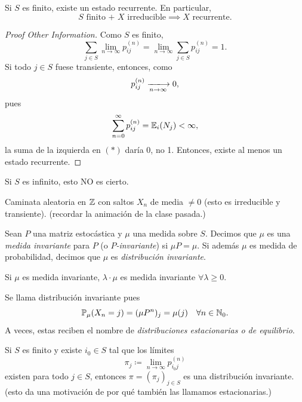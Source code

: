 \begin{corollary}
	Si $S$ es finito, existe un estado recurrente. En particular,
	\[ S \text{ finito + } X \text{ irreducible} \implies X \text{ recurrente}. \]
\end{corollary}
\begin{proof}[Proof Other Information]
	Como $S$ es finito,
	\[ \sum_{j \in S} \lim_{n \to \infty} p_{ij}^{(n)} = \lim_{n \to \infty} \sum_{j \in S} p_{ij}^{(n)} = 1. \tag{$*$} \]
	Si todo $j \in S$ fuese transiente, entonces, como
	\[ p_{ij}^{(n)} \xlongrightarrow[n \to \infty]{} 0, \]
	pues 
	\[ \sum_{n=0}^{\infty} p_{ij}^{(n)} = \mathbb{E}_{i}(N_{j}) < \infty, \]
	la suma de la izquierda en $(*)$ daría 0, no 1. Entonces, existe al menos un estado recurrente.
\end{proof}

\begin{comentarios}
	Si $S$ es infinito, esto NO es cierto.
\end{comentarios}

\begin{eg}
	Caminata aleatoria en $\mathbb{Z}$ con saltos $X_{n}$ de media $\neq 0$ (esto es irreducible y transiente). (recordar la animación de la clase pasada.)
\end{eg}

\begin{definition}
	Sean $P$ una matriz estocástica y $\mu$ una medida sobre $S$. Decimos que $\mu$ es una \textit{medida invariante} para $P$ (o \textit{$P$-invariante}) si $\mu P = \mu$. Si además $\mu$ es medida de probabilidad, decimos que $\mu$ es \textit{distribución invariante}.
\end{definition}

\begin{remark}
	Si $\mu$ es medida invariante, $\lambda \cdot \mu$ es medida invariante $\forall \lambda \geq 0$.
\end{remark}

\begin{comentarios}
	Se llama distribución invariante pues
	\[ \mathbb{P}_{\mu}(X_{n} = j) = (\mu P^{n})_{j} = \mu(j) \quad \forall n \in \mathbb{N}_{0}. \]
	A veces, estas reciben el nombre de \textit{distribuciones estacionarias o de equilibrio}.
\end{comentarios}

\begin{remark}
	Si $S$ es finito y existe $i_{0} \in S$ tal que los límites
	\[ \pi_{j} \coloneq \lim_{n \to \infty} p_{i_{0}j}^{(n)} \]
	existen para todo $j \in S$, entonces $\pi = (\pi_{j})_{j \in S}$ es una distribución invariante. (esto da una motivación de por qué también las llamamos estacionarias.)
\end{remark}

